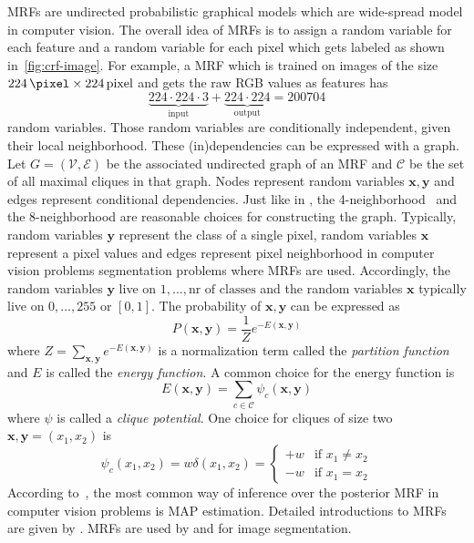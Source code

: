 \documentclass[technote,a4paper,leqno]{IEEEtran}
\begin{document}
\Glspl{MRF} are undirected probabilistic graphical models which are wide-spread
model in computer vision. The overall idea of \glspl{MRF} is to assign a random
variable for each feature and a random variable for each pixel which gets
labeled as shown in~\cref{fig:crf-image}. For example, a \gls{MRF} which is
trained on images of the size
$\SI{224}{\pixel} \times \SI{224}{pixel}$ and gets the raw RGB values as
features has
\[\underbrace{224 \cdot 224 \cdot 3}_{\text{input}} + \underbrace{224 \cdot 224}_{\text{output}} = \num{200704}\]
random variables. Those random variables are conditionally independent, given
their local neighborhood. These (in)dependencies can be expressed with a graph.
Let $G=(\mathcal{V}, \mathcal{E})$ be the associated undirected graph of an
\gls{MRF} and $\mathcal{C}$ be the set of all maximal cliques in that graph.
Nodes represent random variables $\mathbf{x}, \mathbf{y}$ and edges represent
conditional dependencies. Just like in
, the
4-neighborhood~\cite{shotton2006textonboost} and the 8-neighborhood are
reasonable choices for constructing the graph.
Typically, random variables $\mathbf{y}$ represent the class of a single pixel,
random variables $\mathbf{x}$ represent a pixel values and edges represent
pixel neighborhood in computer vision problems segmentation problems where
\glspl{MRF} are used. Accordingly, the random variables $\mathbf{y}$ live on
$1, \dots, \text{nr of classes}$ and the random variables $\mathbf{x}$
typically live on $0, \dots, 255$ or $[0, 1]$.
The probability of $\mathbf{x}, \mathbf{y}$ can be expressed as
\[P(\mathbf{x}, \mathbf{y}) = \frac{1}{Z} e^{-E(\mathbf{x}, \mathbf{y})}\]
where $Z = \sum_{\mathbf{x}, \mathbf{y}} e^{-E(\mathbf{x}, \mathbf{y})}$ is a normalization term called
the \textit{partition function} and $E$ is called the \textit{energy function}.
A common choice for the energy function is
\[E(\mathbf{x}, \mathbf{y}) = \sum_{c \in \mathcal{C}} \psi_c(\mathbf{x}, \mathbf{y})\]
where $\psi$ is called a \textit{clique potential}. One choice for cliques
of size two $\mathbf{x}, \mathbf{y} = (x_1, x_2)$ is~\cite{kato2006markov}
\[\psi_c(x_1, x_2) = w \delta(x_1, x_2) = \begin{cases}+w &\text{if } x_1 \neq x_2\\-w &\text{if } x_1 = x_2\end{cases}\]
According to~\cite{murphy2012machine}, the most common way of inference over
the posterior \gls{MRF} in computer vision problems is \gls{MAP} estimation.
Detailed introductions to \glspl{MRF} are given by
\cite{blake2011markov,murphy2012machine}. \glspl{MRF} are used by \cite{zhang2001segmentation} and \cite{moser2012markov}
for image segmentation.
\end{document}
